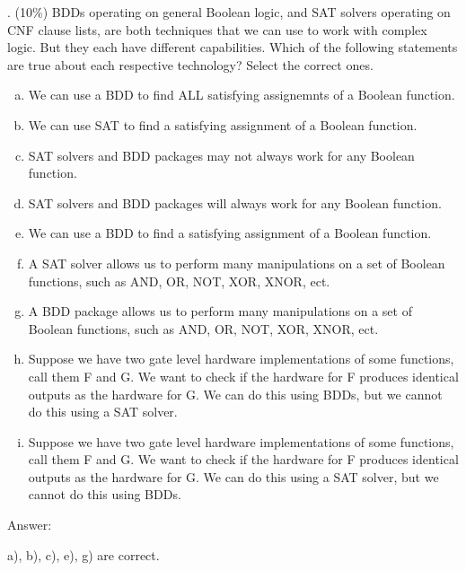 \documentclass[12pt]{article}
\begin{document}
    . (10\%) BDDs operating on general Boolean logic,
    and SAT solvers operating on CNF clause lists,
    are both techniques that we can use to work with complex logic.
    But they each have different capabilities.
    Which of the following statements are true about each respective technology?
    Select the correct ones.
    \begin{enumerate}[a)]
        \item
            We can use a BDD to find ALL satisfying assignemnts of a Boolean function.
        \item
            We can use SAT to find a satisfying assignment of a Boolean function.
        \item
            SAT solvers and BDD packages may not always work for any Boolean function.
        \item
            SAT solvers and BDD packages will always work for any Boolean function.
        \item
            We can use a BDD to find a satisfying assignment of a Boolean function.
        \item
            A SAT solver allows us to perform many manipulations on a set of Boolean functions,
            such as AND, OR, NOT, XOR, XNOR, ect.
        \item
            A BDD package allows us to perform many manipulations on a set of Boolean functions,
            such as AND, OR, NOT, XOR, XNOR, ect.
        \item
            Suppose we have two gate level hardware implementations of some functions,
            call them F and G.
            We want to check if the hardware for F produces identical outputs as the hardware for G.
            We can do this using BDDs,
            but we cannot do this using a SAT solver.
        \item
            Suppose we have two gate level hardware implementations of some functions,
            call them F and G.
            We want to check if the hardware for F produces identical outputs as the hardware for G.
            We can do this using a SAT solver,
            but we cannot do this using BDDs.

    \end{enumerate}

    \noindent
    Answer:

    \noindent
    a), b), c), e), g) are correct.
\end{document}
